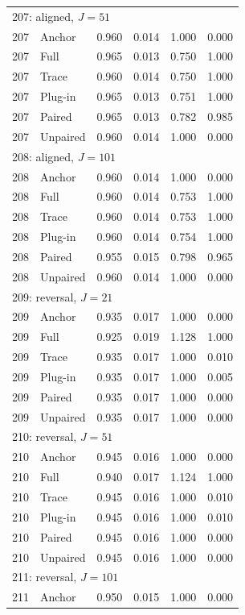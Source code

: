 \begin{longtable}{llrrrr}
\multicolumn{6}{l}{207: aligned, $J=51$}\\
207 & Anchor & 0.960 & 0.014 & 1.000 & 0.000 \\
207 & Full & 0.965 & 0.013 & 0.750 & 1.000 \\
207 & Trace & 0.960 & 0.014 & 0.750 & 1.000 \\
207 & Plug-in & 0.965 & 0.013 & 0.751 & 1.000 \\
207 & Paired & 0.965 & 0.013 & 0.782 & 0.985 \\
207 & Unpaired & 0.960 & 0.014 & 1.000 & 0.000 \\
\multicolumn{6}{l}{208: aligned, $J=101$}\\
208 & Anchor & 0.960 & 0.014 & 1.000 & 0.000 \\
208 & Full & 0.960 & 0.014 & 0.753 & 1.000 \\
208 & Trace & 0.960 & 0.014 & 0.753 & 1.000 \\
208 & Plug-in & 0.960 & 0.014 & 0.754 & 1.000 \\
208 & Paired & 0.955 & 0.015 & 0.798 & 0.965 \\
208 & Unpaired & 0.960 & 0.014 & 1.000 & 0.000 \\
\multicolumn{6}{l}{209: reversal, $J=21$}\\
209 & Anchor & 0.935 & 0.017 & 1.000 & 0.000 \\
209 & Full & 0.925 & 0.019 & 1.128 & 1.000 \\
209 & Trace & 0.935 & 0.017 & 1.000 & 0.010 \\
209 & Plug-in & 0.935 & 0.017 & 1.000 & 0.005 \\
209 & Paired & 0.935 & 0.017 & 1.000 & 0.000 \\
209 & Unpaired & 0.935 & 0.017 & 1.000 & 0.000 \\
\multicolumn{6}{l}{210: reversal, $J=51$}\\
210 & Anchor & 0.945 & 0.016 & 1.000 & 0.000 \\
210 & Full & 0.940 & 0.017 & 1.124 & 1.000 \\
210 & Trace & 0.945 & 0.016 & 1.000 & 0.010 \\
210 & Plug-in & 0.945 & 0.016 & 1.000 & 0.010 \\
210 & Paired & 0.945 & 0.016 & 1.000 & 0.000 \\
210 & Unpaired & 0.945 & 0.016 & 1.000 & 0.000 \\
\multicolumn{6}{l}{211: reversal, $J=101$}\\
211 & Anchor & 0.950 & 0.015 & 1.000 & 0.000 \\

\end{longtable}
